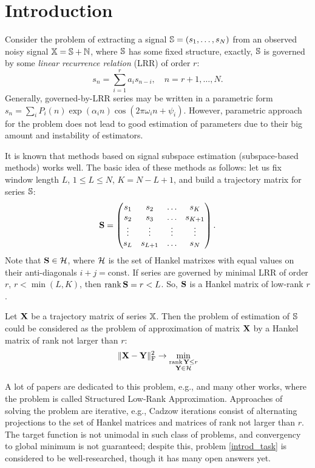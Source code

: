 \documentclass[12pt,a4paper,fleqn,leqno]{article}
\def\rank{\mathop{\mathrm{rank}}}
\begin{document}
\section{Introduction}
Consider the problem of extracting a signal $\mathbb{S} = (s_1, \ldots, s_N)$ from an observed noisy signal $\mathbb{X} = \mathbb{S} + \mathbb{N}$, where $\mathbb{S}$ has some fixed structure, exactly, $\mathbb{S}$ is governed by some \emph{linear recurrence relation} (LRR) of order $r$:
\begin{equation*}
s_n = \sum_{i = 1}^{r} a_i s_{n-i}, \quad n = r + 1, \ldots, N.
\end{equation*}
Generally, governed-by-LRR series may be written in a parametric form \\ $s_n = \sum_i P_i(n) \exp(\alpha_i n) \cos(2 \pi \omega_i n + \psi_i)$. However, parametric approach for the problem does not lead to good estimation of parameters due to their big amount and instability of estimators.

It is known that methods based on signal subspace estimation (subspace-based methods) works well. The basic idea of these methods as follows: let us fix window length $L$, $1 \le L \le N$, $K = N - L + 1$, and build a trajectory matrix for series $\mathbb{S}$:
\begin{equation*}
\mathbf{S} = \begin{pmatrix}
s_1 & s_2 & \ldots & s_K \\
s_2 & s_3 & \ldots & s_{K + 1} \\
\vdots & \vdots & \vdots & \vdots \\
s_L & s_{L + 1} & \ldots & s_N
\end{pmatrix}.
\end{equation*}
Note that $\mathbf{S}\in \mathcal{H}$, where $\mathcal{H}$ is the set of Hankel matrixes with equal values on their anti-diagonals $i+j=\mathrm{const}$.
If series are governed by minimal LRR of order $r$, $r < \min(L, K)$, then $\rank \bfS = r < L$. So, $\mathbf{S}$ is a Hankel matrix of low-rank $r$.

Let $\mathbf{X}$ be a trajectory matrix of series $\mathbb{X}$. Then the problem of estimation of $\mathbb{S}$ could be considered as the problem of approximation of matrix $\mathbf{X}$ by a Hankel matrix of rank not larger than $r$:
\begin{equation}\label{introd_task}
\|\bfX - \bfY\|^2_\rmF \to \min_{\substack{\rank \bfY \le r \\ \bfY \in \calH}}
\end{equation}

A lot of papers are dedicated to this problem, e.g., \cite{Cadzow1988, Markovsky2011, Usevich.Markovsky2014, Gillard.Zhigljavsky2013} and many other works, where the problem is called Structured Low-Rank Approximation. Approaches of solving the problem are iterative, e.g., Cadzow iterations consist of alternating projections to the set of Hankel matrices and matrices of rank not larger than $r$. The target function is not unimodal in such class of problems, and convergency to global minimum is not guaranteed; despite this, problem \eqref{introd_task} is considered to be well-researched, though it has many open answers yet.
\end{document}
